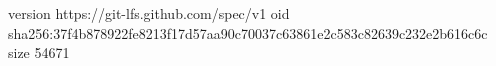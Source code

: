 version https://git-lfs.github.com/spec/v1
oid sha256:37f4b878922fe8213f17d57aa90c70037c63861e2c583c82639c232e2b616c6c
size 54671
